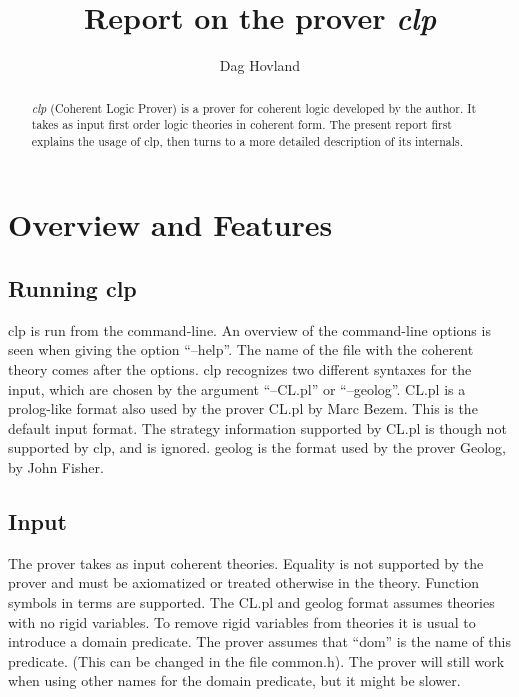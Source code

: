 \documentclass[a4paper]{article}
\author{Dag Hovland}
\title{Report on the prover \emph{clp}}
\begin{document}
\maketitle
\begin{abstract}
  \emph{clp} (Coherent Logic Prover) is a prover for coherent logic developed by the author. It takes as input first order logic theories in coherent form. The present report first explains the usage of clp, then turns to a more detailed description of its internals.
\end{abstract}
\section{Overview and Features}
\subsection{Running clp}
clp is run from the command-line. An overview of the command-line options is seen when giving the option ``--help''. The name of the file with the coherent theory comes after the options. clp recognizes two different syntaxes for the input, which are chosen by the argument ``--CL.pl'' or ``--geolog''. CL.pl is a prolog-like format also used by the prover CL.pl by Marc Bezem. This is the default input format. The strategy information supported by CL.pl is though not supported by clp, and is ignored. geolog is the format used by the prover Geolog, by John Fisher.

\subsection{Input}
The prover takes as input coherent theories. Equality is not supported by the prover and must be axiomatized or treated otherwise in the theory. Function symbols in terms are supported. The CL.pl and geolog format assumes theories with no rigid variables. To remove rigid variables from theories it is usual to introduce a domain predicate. The prover assumes that ``dom'' is the name of this predicate. (This can be changed in the file common.h). The prover will still work when using other names for the domain predicate, but it might be slower. 
\end{document}
